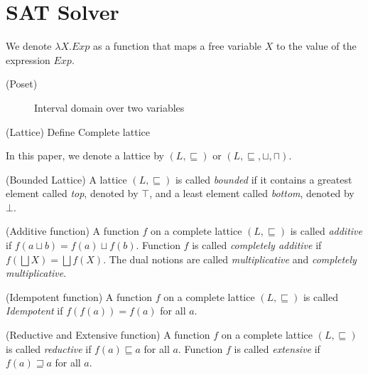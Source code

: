 \section{SAT Solver}

\begin{definition}
We denote $\lambda X. Exp$ as a function that maps a free variable $X$ to the 
value of the expression $Exp$.
\end{definition}
%
\begin{definition} (Poset)

\end{definition}
%
\begin{figure}[htbp]
\centering
{}
\caption{Interval domain over two variables \label{fig:interval}}
\end{figure}
%
\begin{definition} (Lattice)
Define Complete lattice
\end{definition}
In this paper, we denote a lattice by $(L, \sqsubseteq)$ or $(L, \sqsubseteq,
\sqcup, \sqcap)$.
%
%
\begin{definition} (Bounded Lattice)
A lattice $(L, \sqsubseteq)$ is called \emph{bounded} if it contains a greatest 
element called \emph{top}, denoted by $\top$, and a least element called 
\emph{bottom}, denoted by $\bot$.
\end{definition}
%
\begin{definition} (Additive function)
A function $f$ on a complete lattice $(L, \sqsubseteq)$ is called \emph{additive} 
if $f(a \sqcup b) = f(a) \sqcup f(b)$. Function $f$ is called \emph{completely additive} 
if $f(\bigsqcup X) = \bigsqcup f(X)$.  The dual notions are called \emph{multiplicative} 
and \emph{completely multiplicative}.
\end{definition}
%
\begin{definition} (Idempotent function)
A function $f$ on a complete lattice $(L, \sqsubseteq)$ is called \emph{Idempotent} 
if $f(f(a)) = f(a)$ for all $a$. 
\end{definition}
%
\begin{definition} (Reductive and Extensive function)
A function $f$ on a complete lattice $(L, \sqsubseteq)$ is called \emph{reductive} 
if $f(a) \sqsubseteq a$ for all $a$. Function $f$ is called \emph{extensive} if 
$f(a) \sqsupseteq a$ for all $a$.
\end{definition}
